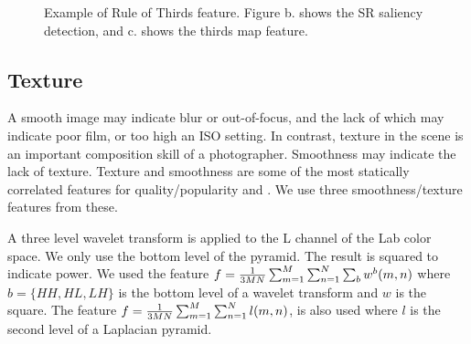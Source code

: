 \documentclass[conference,a4paper]{IEEEtran}
\begin{document}
\begin{figure}
  \centering
  \caption{
    Example of Rule of Thirds feature.  Figure b. shows the SR saliency detection, and c. shows the thirds map feature.
  }
\end{figure}

  \subsection{Texture}
  A smooth image may indicate blur or out-of-focus, and the lack of which may indicate poor film, or too high an ISO setting.  In contrast, texture in the scene is an important composition skill of a photographer.  Smoothness may indicate the lack of texture.  Texture and smoothness are some of the most statically correlated features for quality/popularity \cite{wang2015automatic} and \cite{khosla2014makes}.  We use three smoothness/texture features from these.

  A three level wavelet transform is applied to the L channel of the Lab color space.  We only use the bottom level of the pyramid.  The result is squared to indicate power.  We used the feature $f = {1\over 3MN} \sum_{m=1}^{M}\sum_{n=1}^{N}\sum_{b}w^b(m, n)$ where $b = \{HH, HL, LH\}$ is the bottom level of a wavelet transform and $w$ is the square.  The feature $f = {1\over 3MN} \sum_{m=1}^{M}\sum_{n=1}^{N}l(m, n)$, is also used where $l$ is the second level of a Laplacian pyramid.
\end{document}
